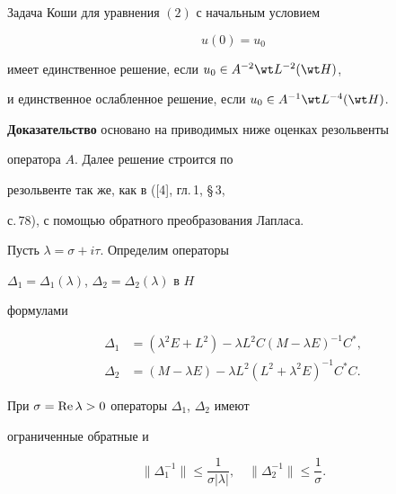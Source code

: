 


\begin{thm} 


Задача Коши для уравнения $(2)$ с начальным условием 


\begin{equation} 


u(0)=u_0 


\end{equation} 


имеет единственное решение, если $u_0\in A^{-2}\wt L{}^{-2}(\wt H)$, 


и единственное ослабленное решение, если $u_0\in A^{-1}\wt L{}^{-4}(\wt H)$. 


\end{thm} 


 


 


{\bf Доказательство} основано на приводимых ниже оценках резольвенты 


оператора $A$. Далее решение строится по 


резольвенте так же, как в ([4], гл.\,1, \S\,3, 


с.\,78), с помощью обратного преобразования Лапласа. 


 


Пусть $\lambda=\sigma+i\tau$. Определим операторы 


$\Delta_1=\Delta_1(\lambda)$, $\Delta_2=\Delta_2(\lambda)$ в $H$ 


формулами 


\begin{align*} 


\Delta_1&=(\lambda^2E+L^2)-\lambda L^2C 


(M-\lambda E)^{-1}C^*,\\ 


\Delta_2&=(M-\lambda E)-\lambda L^2 


(L^2+\lambda^2E)^{-1}C^*C. 


\end{align*} 


 


 


\begin{lem} 


При $\sigma=\operatorname{Re}\lambda>0$ операторы $\Delta_1$, $\Delta_2$ имеют 


ограниченные обратные и


$$


\|\Delta^{-1}_1\|\le \frac{1}{\sigma|\lambda|}, \quad


\|\Delta^{-1}_2\|\le\frac{1}{\sigma}. 


$$


\end{lem} 



